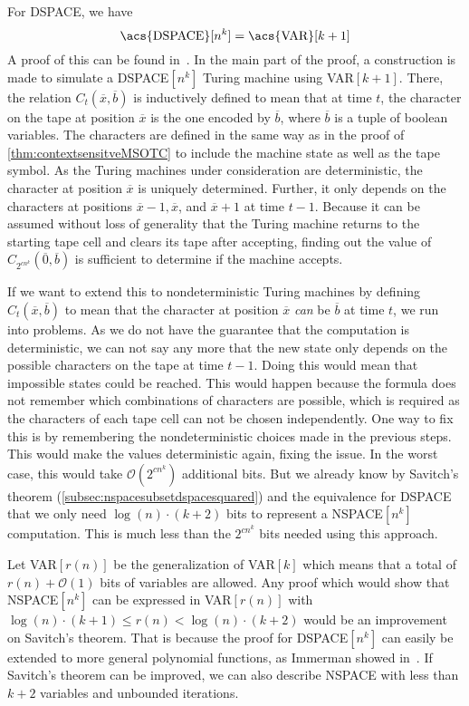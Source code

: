 For \acs{DSPACE}, we have
\[
    \text{\acs{DSPACE}}[n^k] = \text{\acs{VAR}}[k + 1]
\]
A proof of this can be found in~\cite{descriptive-complexity}.
In the main part of the proof, a construction is made to simulate a \acs{DSPACE}$[n^k]$ Turing machine using \acs{VAR}$[k + 1]$.
There, the relation $C_{t}(\overline{x}, \overline{b})$ is inductively defined to mean that at time $t$, the character on the tape at position $\overline{x}$ is the one encoded by $\overline{b}$, where $\overline{b}$ is a tuple of boolean variables.
The characters are defined in the same way as in the proof of \cref{thm:contextsensitveMSOTC} to include the machine state as well as the tape symbol.
As the Turing machines under consideration are deterministic, the character at position $\overline{x}$ is uniquely determined.
Further, it only depends on the characters at positions $\overline{x} - 1, \overline{x}$, and $\overline{x} + 1$ at time $t - 1$.
Because it can be assumed without loss of generality that the Turing machine returns to the starting tape cell and clears its tape after accepting, finding out the value of $C_{2^{cn^k}}(\overline{0}, \overline{b})$ is sufficient to determine if the machine accepts.

If we want to extend this to nondeterministic Turing machines by defining $C_{t}(\overline{x}, \overline{b})$ to mean that the character at position $\overline{x}$ \emph{can} be $\overline{b}$ at time $t$, we run into problems.
As we do not have the guarantee that the computation is deterministic, we can not say any more that the new state only depends on the possible characters on the tape at time $t - 1$.
Doing this would mean that impossible states could be reached.
This would happen because the formula does not remember which combinations of characters are possible, which is required as the characters of each tape cell can not be chosen independently.
One way to fix this is by remembering the nondeterministic choices made in the previous steps.
This would make the values deterministic again, fixing the issue.
In the worst case, this would take $\mathcal{O}(2^{cn^k})$ additional bits.
But we already know by Savitch's theorem (\cref{subsec:nspacesubsetdspacesquared}) and the equivalence for \acs{DSPACE} that we only need $\log(n) \cdot (k + 2)$ bits to represent a \acs{NSPACE}$[n^k]$ computation.
This is much less than the $2^{cn^k}$ bits needed using this approach.

Let \acs{VAR}$[r(n)]$ be the generalization of \acs{VAR}$[k]$ which means that a total of $r(n) + \mathcal{O}(1)$ bits of variables are allowed.
Any proof which would show that \acs{NSPACE}$[n^k]$ can be expressed in \acs{VAR}$[r(n)]$ with $\log(n) \cdot (k + 1) \leq r(n) < \log(n) \cdot (k + 2)$ would be an improvement on Savitch's theorem.
That is because the proof for \acs{DSPACE}$[n^k]$ can easily be extended to more general polynomial functions, as Immerman showed in~\cite{Immerman1999}.
If Savitch's theorem can be improved, we can also describe \acs{NSPACE} with less than $k + 2$ variables and unbounded iterations.


